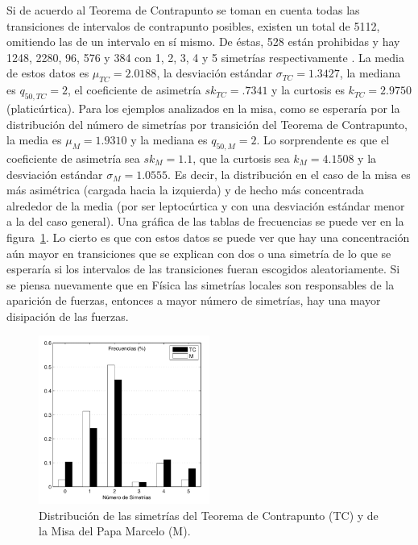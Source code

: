 \documentclass[letterpaper,12pt]{book}
\theoremstyle{definition} \newtheorem{Def}{Definición}[chapter]
\theoremstyle{definition} \newtheorem{Teo}{Teorema}[chapter]
\theoremstyle{definition} \newtheorem{Pro}{Proposición}[chapter]
\theoremstyle{definition} \newtheorem{Lema}{Lema}[chapter]
\begin{document}
Si de acuerdo al Teorema de Contrapunto se toman en cuenta todas las transiciones de intervalos de contrapunto posibles, existen un total de 5112, omitiendo las de un intervalo en sí mismo. De éstas, 528 están prohibidas y hay 1248, 2280, 96, 576 y 384 con 1, 2, 3, 4 y 5 simetrías respectivamente \cite{TesisOctavio}. La media de estos datos es  $\mu_{TC}=2{.}0188$, la desviación estándar $\sigma_{TC}=1{.}3427$, la mediana es $q_{50,TC}=2$, el coeficiente de asimetría $sk_{TC}={.}7341$ y la curtosis es $k_{TC}=2{.}9750$ (platicúrtica). Para los ejemplos analizados en la misa, como se esperaría por la distribución del número de simetrías por transición del Teorema de Contrapunto, la media es $\mu_M=1{.}9310$ y la mediana es $q_{50,M}=2$. Lo sorprendente es que el coeficiente de asimetría sea $sk_{M}=1{.}1$, que la curtosis sea $k_M=4{.}1508$ y la desviación estándar $\sigma_M=1{.}0555$. Es decir, la distribución en el caso de la misa es más asimétrica (cargada hacia la izquierda) y de hecho más concentrada alrededor de la media (por ser leptocúrtica y con una desviación estándar menor a la del caso general). Una gráfica de las tablas de frecuencias se puede ver en la figura~\ref{Frecuencias}. Lo cierto es que con estos datos se puede ver que hay una concentración aún mayor en transiciones que se explican con dos o una simetría de lo que se esperaría si los intervalos de las transiciones fueran escogidos aleatoriamente. Si se piensa nuevamente que en Física las simetrías locales son responsables de la aparición de fuerzas, entonces a mayor número de simetrías, hay una mayor disipación de las fuerzas. 

\begin{figure}[h]
\centering
\includegraphics[angle=0, width=0.5\textwidth]{Frecuencias.png}
\caption{\label{Frecuencias}Distribución de las simetrías del Teorema de Contrapunto (TC) y de la Misa del Papa Marcelo (M).}
\end{figure}
\end{document}
